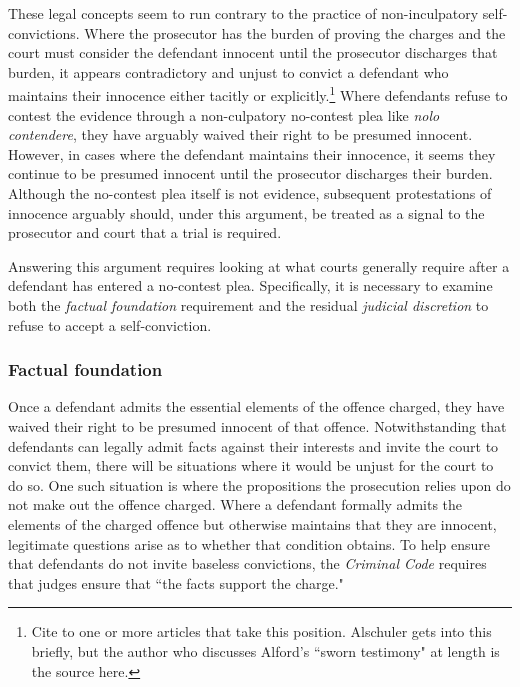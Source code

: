 These legal concepts seem to run contrary to the practice of non-inculpatory self-convictions. Where the prosecutor has the burden of proving the charges and the court must consider the defendant innocent until the prosecutor discharges that burden, it appears contradictory and unjust to convict a defendant who maintains their innocence either tacitly or explicitly.\footnote{Cite to one or more articles that take this position. Alschuler gets into this briefly, but the author who discusses Alford's ``sworn testimony" at length is the source here.} Where defendants refuse to contest the evidence through a non-culpatory no-contest plea like \textit{nolo contendere}, they have arguably waived their right to be presumed innocent. However, in cases where the defendant maintains their innocence, it seems they continue to be presumed innocent until the prosecutor discharges their burden. Although the no-contest plea itself is not evidence, subsequent protestations of innocence arguably should, under this argument, be treated as a signal to the prosecutor and court that a trial is required.

Answering this argument requires looking at what courts generally require after a defendant has entered a no-contest plea. Specifically, it is necessary to examine both the \textit{factual foundation} requirement and the residual \textit{judicial discretion} to refuse to accept a self-conviction.

\subsubsection{Factual foundation}

Once a defendant admits the essential elements of the offence charged, they have waived their right to be presumed innocent of that offence. Notwithstanding that defendants can legally admit facts against their interests and invite the court to convict them, there will be situations where it would be unjust for the court to do so. One such situation is where the propositions the prosecution relies upon do not make out the offence charged. Where a defendant formally admits the elements of the charged offence but otherwise maintains that they are innocent, legitimate questions arise as to whether that condition obtains. To help ensure that defendants do not invite baseless convictions, the \textit{Criminal Code} requires that judges ensure that ``the facts support the charge." 

